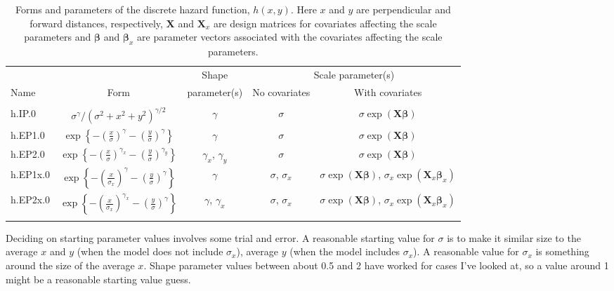 \documentclass{article}
\begin{document}
\begin{table}
\centering
\caption{Forms and parameters of the discrete hazard function, $h(x,y)$. Here $x$ and $y$ are perpendicular and forward distances, respectively, $\mathbf{X}$ and $\mathbf{X}_x$ are design matrices for covariates affecting the scale parameters and $\boldsymbol{\beta}$ and $\boldsymbol{\beta}_x$ are parameter vectors associated with the covariates affecting the scale parameters. 
\label{tab:hazfuns}}
\begin{tabular}{lcccc}
\hline
       &     &Shape        & \multicolumn{2}{c}{Scale parameter(s)}\\
\cline{4-5}
Name   &Form &parameter(s) &No covariates &With covariates \\
\hline \\
h.IP.0 &$\sigma^\gamma/\left(\sigma^2+x^2+y^2\right)^{\gamma/2}$ & $\gamma$ & $\sigma$ & $\sigma\exp(\mathbf{X}\boldsymbol{\beta})$
\vspace{10pt} \\
h.EP1.0 &$\exp\left\{-\left(\frac{x}{\sigma}\right)^{\gamma}-\left(\frac{y}{\sigma}\right)^{\gamma}\right\}$ & $\gamma$ & $\sigma$ & $\sigma\exp(\mathbf{X}\boldsymbol{\beta})$
\vspace{10pt} \\
h.EP2.0 &$\exp\left\{-\left(\frac{x}{\sigma}\right)^{\gamma_x}-\left(\frac{y}{\sigma}\right)^{\gamma_y}\right\}$ & $\gamma_x$, $\gamma_y$ & $\sigma$ & $\sigma\exp(\mathbf{X}\boldsymbol{\beta})$
\vspace{10pt} \\
h.EP1x.0 &$\exp\left\{-\left(\frac{x}{\sigma_x}\right)^{\gamma}-\left(\frac{y}{\sigma}\right)^{\gamma}\right\}$ & $\gamma$ & $\sigma$, $\sigma_x$ & $\sigma\exp(\mathbf{X}\boldsymbol{\beta})$, $\sigma_x\exp(\mathbf{X}_x\boldsymbol{\beta}_x)$  
\vspace{10pt} \\ 
h.EP2x.0 &$\exp\left\{-\left(\frac{x}{\sigma_x}\right)^{\gamma_x}-\left(\frac{y}{\sigma}\right)^{\gamma}\right\}$ & $\gamma$, $\gamma_x$& $\sigma$, $\sigma_x$ & $\sigma\exp(\mathbf{X}\boldsymbol{\beta})$, $\sigma_x\exp(\mathbf{X}_x\boldsymbol{\beta}_x)$  \\
\\
\hline
\end{tabular}
\end{table}

Deciding on starting parameter values involves some trial and error. A reasonable starting value for $\sigma$ is to make it similar size to the average $x$ and $y$ (when the model does not include $\sigma_x$), average $y$ (when the model includes $\sigma_x$). A reasonable value for $\sigma_x$ is something around the size of the average $x$. Shape parameter values between about 0.5 and 2 have worked for cases I've looked at, so a value around 1 might be a reasonable starting value guess.
\end{document}

